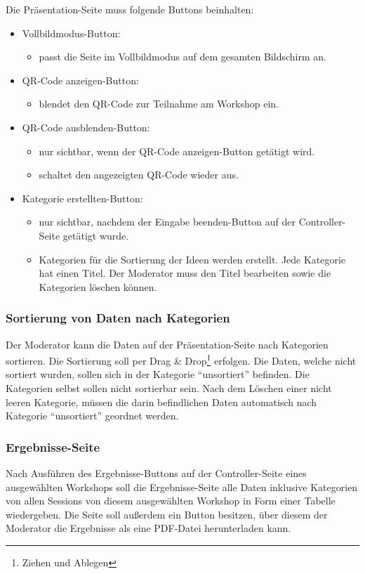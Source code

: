 Die Präsentation-Seite muss folgende Buttons beinhalten:
\begin{itemize}
\item Vollbildmodus-Button:
\begin{itemize}
\item passt die Seite im Vollbildmodus auf dem gesamten Bildschirm an.
\end{itemize}
\item QR-Code anzeigen-Button:
\begin{itemize}
\item blendet den QR-Code zur Teilnahme am Workshop ein.
\end{itemize}
\item QR-Code ausblenden-Button:
\begin{itemize}
\item nur sichtbar, wenn der QR-Code anzeigen-Button getätigt wird.
\item schaltet den angezeigten QR-Code wieder aus.
\end{itemize}
\item Kategorie erstellten-Button:
\begin{itemize}
\item nur sichtbar, nachdem der Eingabe beenden-Button auf der Controller-Seite getätigt wurde.
\item Kategorien für die Sortierung der Ideen werden erstellt. Jede Kategorie hat einen Titel. Der Moderator muss den Titel bearbeiten sowie die Kategorien löschen können.
\end{itemize}
\end{itemize}

\newpage
\subsubsection*{Sortierung von Daten nach Kategorien}
Der Moderator kann die Daten auf der Präsentation-Seite nach Kategorien sortieren. Die Sortierung soll per Drag \& Drop\footnote{Ziehen und Ablegen} erfolgen. Die Daten, welche nicht sortiert wurden, sollen sich in der Kategorie “unsortiert” befinden. Die Kategorien selbst sollen nicht sortierbar sein. Nach dem Löschen einer nicht leeren Kategorie, müssen die darin befindlichen Daten automatisch nach Kategorie “unsortiert” geordnet werden.

\subsubsection*{Ergebnisse-Seite}
Nach Ausführen des Ergebnisse-Buttons auf der Controller-Seite eines ausgewählten Workshops soll die Ergebnisse-Seite alle Daten inklusive Kategorien von allen Sessions von diesem ausgewählten Workshop in Form einer Tabelle wiedergeben. Die Seite soll außerdem ein Button besitzen, über diesem der Moderator die Ergebnisse als eine PDF-Datei herunterladen kann.

